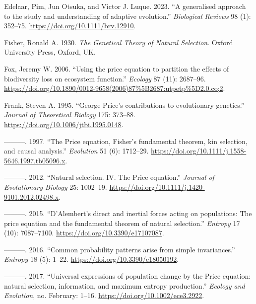 \documentclass[
]{article}
\newlength{\cslhangindent}
\newlength{\cslentryspacingunit} %
\newenvironment{CSLReferences}[2] %
 {%
  \setlength{\parindent}{0pt}
  \ifodd #1
  \let\oldpar\par
  \def\par{\hangindent=\cslhangindent\oldpar}
  \fi
  \setlength{\parskip}{#2\cslentryspacingunit}
 }%
 {}
\begin{document}
\begin{CSLReferences}{1}{0}
\leavevmode{}%
Edelaar, Pim, Jun Otsuka, and Victor J. Luque. 2023. {``{A generalised
approach to the study and understanding of adaptive evolution}.''}
\emph{Biological Reviews} 98 (1): 352--75.
\url{https://doi.org/10.1111/brv.12910}.

\leavevmode{}%
Fisher, Ronald A. 1930. \emph{The Genetical Theory of Natural
Selection}. Oxford University Press, Oxford, UK.

\leavevmode{}%
Fox, Jeremy W. 2006. {``{Using the price equation to partition the
effects of biodiversity loss on ecosystem function}.''} \emph{Ecology}
87 (11): 2687--96.
\url{https://doi.org/10.1890/0012-9658(2006)87\%5B2687:utpetp\%5D2.0.co;2}.

\leavevmode{}%
Frank, Steven A. 1995. {``{George Price's contributions to evolutionary
genetics}.''} \emph{Journal of Theoretical Biology} 175: 373--88.
\url{https://doi.org/10.1006/jtbi.1995.0148}.

\leavevmode{}%
---------. 1997. {``{The Price equation, Fisher's fundamental theorem,
kin selection, and causal analysis}.''} \emph{Evolution} 51 (6):
1712--29. \url{https://doi.org/10.1111/j.1558-5646.1997.tb05096.x}.

\leavevmode{}%
---------. 2012. {``{Natural selection. IV. The Price equation}.''}
\emph{Journal of Evolutionary Biology} 25: 1002--19.
\url{https://doi.org/10.1111/j.1420-9101.2012.02498.x}.

\leavevmode{}%
---------. 2015. {``{D'Alembert's direct and inertial forces acting on
populations: The price equation and the fundamental theorem of natural
selection}.''} \emph{Entropy} 17 (10): 7087--7100.
\url{https://doi.org/10.3390/e17107087}.

\leavevmode{}%
---------. 2016. {``{Common probability patterns arise from simple
invariances}.''} \emph{Entropy} 18 (5): 1--22.
\url{https://doi.org/10.3390/e18050192}.

\leavevmode{}%
---------. 2017. {``{Universal expressions of population change by the
Price equation: natural selection, information, and maximum entropy
production}.''} \emph{Ecology and Evolution}, no. February: 1--16.
\url{https://doi.org/10.1002/ece3.2922}.


\end{CSLReferences}
\end{document}
